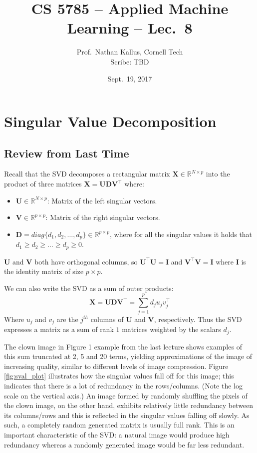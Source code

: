 \documentclass[a4paper]{article}
\title{CS 5785 -- Applied Machine Learning -- Lec.\ 8}
\author{Prof.\ Nathan Kallus, Cornell Tech\\Scribe: TBD}
\date{Sept.\ 19, 2017}
\begin{document}
\maketitle

\section{Singular Value Decomposition}

\subsection{Review from Last Time}
Recall that the SVD decomposes a rectangular matrix ${\mathbf X}\in {\mathbb R}^{N\times p}$ into the product of three matrices $\mathbf{X}=\mathbf{UD}\mathbf{V}^\top$ where:
\begin{itemize}
\item ${\mathbf U}\in {\mathbb R}^{N\times p}$: Matrix of the left singular vectors.
\item ${\mathbf V}\in {\mathbb R}^{p\times p}$: Matrix of the right singular vectors.
\item ${\mathbf D}=diag\{d_1,d_2,\ldots, d_p\}\in {\mathbb R}^{p\times p}$, where for all the singular values it holds that $d_1\geq d_2\geq \ldots \geq d_p \geq 0$.
\end{itemize}
$\mathbf{U}$ and $\mathbf{V}$ both have orthogonal columns, so $\mathbf{U}^\top\mathbf{U}=\mathbf{I}$ and $\mathbf{V}^\top\mathbf{V}=\mathbf{I}$ where $\mathbf{I}$ is the identity matrix of size $p\times p$.

We can also write the SVD as a sum of outer products: $$\mathbf{X}=\mathbf{UD}\mathbf{V}^\top=\sum_{j=1}^pd_ju_jv_j^\top$$
Where $u_j$ and $v_j$ are the  $j^{th}$ columns of $\mathbf{U}$ and $\mathbf{V}$, respectively. Thus the SVD expresses a matrix as a sum of rank $1$ matrices weighted by the scalars $d_j$.

The clown image in Figure 1 example from the last lecture shows examples of this sum truncated at 2, 5 and 20 terms, yielding approximations of the image of increasing quality, similar to different levels of image compression.  Figure \ref{fig:sval_plot} illustrates how the singular values fall off for this image; this indicates that there is a lot of redundancy in the rows/columns.  (Note the log scale on the vertical axis.)  An image formed by randomly shuffling the pixels of the clown image, on the other hand, exhibits relatively little redundancy between its columns/rows and this is reflected in the singular values falling off slowly. As such, a completely random generated matrix is usually full rank. This is an important characteristic of the SVD: a natural image would produce high redundancy whereas a randomly generated image would be far less redundant. 
\end{document}

